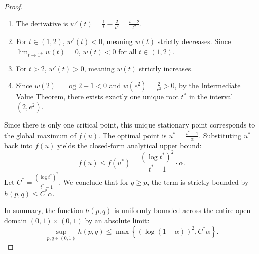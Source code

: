 \documentclass{article}
\theoremstyle{plain}
\theoremstyle{definition}
\theoremstyle{remark}
\begin{document}
\begin{proof}
\begin{enumerate}
		\item The derivative is $w'(t) = \frac{1}{t} - \frac{2}{t^2} = \frac{t - 2}{t^2}$.
		\item For $t \in (1, 2)$, $w'(t) < 0$, meaning $w(t)$ strictly decreases. Since $\lim_{t \to 1^+} w(t) = 0$, $w(t) < 0$ for all $t \in (1, 2)$.
		\item For $t > 2$, $w'(t) > 0$, meaning $w(t)$ strictly increases.
		\item Since $w(2)=\log2-1 < 0$ and $w(e^2)=\frac{2}{e^2}>0$, by the Intermediate Value Theorem, there exists exactly one unique root $t^*$ in the interval $(2, e^2)$.
	\end{enumerate}
	Since there is only one critical point, this unique stationary point corresponds to the global maximum of $f(u)$. The optimal point is $u^* = \frac{t^* - 1}{\alpha}$. Substituting $u^*$ back into $f(u)$ yields the closed-form analytical upper bound:
	\begin{equation}
		f(u)\leq f(u^*)=\frac{\left(\log t^*\right)^2}{t^* - 1}\cdot\alpha.
	\end{equation}
	Let $C^* = \frac{\left(\log t^*\right)^2}{t^* - 1}$. We conclude that for $q \geq p$, the term is strictly bounded by $h(p, q) \leq C^* \alpha$.
	
	In summary, the function $h(p, q)$ is uniformly bounded across the entire open domain $(0, 1) \times (0, 1)$ by an absolute limit:
	\begin{equation}
		\sup_{p, q \in (0,1)} h(p, q) \leq \max\left\{\left(\log(1-\alpha)\right)^2, C^*\alpha\right\}.
	\end{equation}
	

\end{proof}
\end{document}
